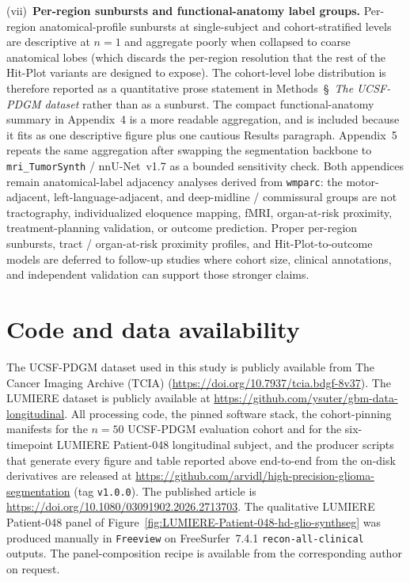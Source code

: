 \documentclass[a4paper,11pt,leqno]{article}
\begin{document}
(vii)~\textbf{Per-region sunbursts and functional-anatomy label
groups.} Per-region anatomical-profile sunbursts at single-subject
and cohort-stratified levels are descriptive at $n{=}1$ and aggregate
poorly when collapsed to coarse anatomical lobes (which discards the
per-region resolution that the rest of the Hit-Plot variants are
designed to expose). The cohort-level lobe distribution is therefore
reported as a quantitative prose statement in
Methods~\S~\emph{The UCSF-PDGM dataset} rather than as a sunburst.
The compact functional-anatomy summary in Appendix~4 is a more
readable aggregation, and is included because it fits as one
descriptive figure plus one cautious Results paragraph. Appendix~5 repeats the same aggregation after swapping the segmentation backbone
to \texttt{mri\_TumorSynth} / nnU-Net~v1.7 as a bounded sensitivity
check. Both appendices remain
anatomical-label adjacency analyses derived from \texttt{wmparc}: the
motor-adjacent, left-language-adjacent, and deep-midline /
commissural groups are not tractography, individualized eloquence
mapping, fMRI, organ-at-risk proximity, treatment-planning validation,
or outcome prediction.
Proper per-region sunbursts, tract / organ-at-risk proximity
profiles, and Hit-Plot-to-outcome models are deferred to follow-up
studies where cohort size, clinical annotations, and independent
validation can support those stronger claims.

\section{Code and data availability}
\begin{sloppypar}
The UCSF-PDGM dataset used in this study is publicly available from
The Cancer Imaging Archive (TCIA)
(\url{https://doi.org/10.7937/tcia.bdgf-8v37}). The LUMIERE dataset
is publicly available at
\url{https://github.com/ysuter/gbm-data-longitudinal}. All
processing code, the pinned software stack, the cohort-pinning
manifests for the $n=50$ UCSF-PDGM evaluation cohort and for the
six-timepoint LUMIERE Patient-048 longitudinal subject, and the
producer scripts that generate every figure and table reported
above end-to-end from the on-disk derivatives are released at
\url{https://github.com/arvidl/high-precision-glioma-segmentation}
(tag \texttt{v1.0.0}). The published article is
\url{https://doi.org/10.1080/03091902.2026.2713703}.
The qualitative LUMIERE Patient-048 panel of
Figure~\ref{fig:LUMIERE-Patient-048-hd-glio-synthseg} was produced
manually in \texttt{Freeview} on FreeSurfer~7.4.1
\texttt{recon-all-clinical} outputs. The panel-composition recipe is available from the corresponding author on request.
\end{sloppypar}
\end{document}

